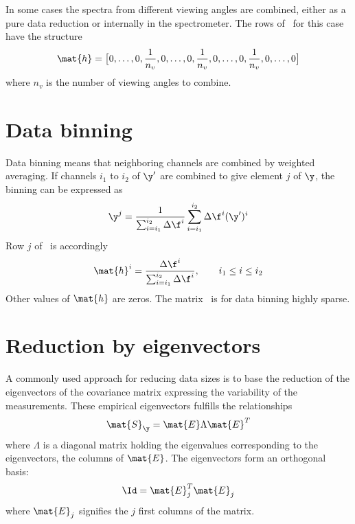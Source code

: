  In some cases the spectra from different viewing angles are combined,
 either as a pure data reduction or internally in the spectrometer.
 The rows of \Hd\ for this case have the structure
 \begin{equation}
   \mat{h} = \big[ 0,\dots,0,\frac{1}{n_v},0,\dots,0,\frac{1}{n_v},0,\dots,0,\frac{1}{n_v},0,\dots,0\big]
 \end{equation}
 where $n_v$ is the number of viewing angles to combine.


\section{Data binning}
 \label{sec:red:binning}
 
 Data binning means that neighboring channels are combined by
 weighted averaging. If channels $i_1$ to $i_2$ of $\y'$ are combined to
 give element $j$ of $\y$, the binning can be expressed as
 \begin{equation}
   \y^j = \frac{1}{\sum_{i=i_1}^{i_2}{\Delta \f^i}} \sum_{i=i_1}^{i_2}{\Delta \f^i (\y')^i}
 \end{equation}
 Row $j$ of \Hd\ is accordingly
 \begin{equation}
   \mat{h}^i = \frac{\Delta \f^i}{\sum_{i=i_1}^{i_2}{\Delta \f^i}}, \qquad
    i_1\leq i \leq i_2
 \end{equation}
 Other values of $\mat{h}$ are zeros. The matrix \Hd\ is for data
 binning highly sparse.



\section{Reduction by eigenvectors}
 \label{sec:red:eig}
 
 A commonly used approach for reducing data sizes is to base the
 reduction of the eigenvectors of the covariance matrix expressing the
 variability of the measurements. These empirical eigenvectors
 fulfills the relationships
 \begin{equation}
   \mat{S}_\y = \mat{E}\Lambda\mat{E}^T
 \end{equation}
 where $\Lambda$ is a diagonal matrix holding the eigenvalues
 corresponding to the eigenvectors, the columns of $\mat{E}$. The
 eigenvectors form an orthogonal basis:
 \begin{equation}
   \Id = \mat{E}^T_j\mat{E}_j
 \end{equation}
 where $\mat{E}_j$ signifies the $j$ first columns of the matrix.

